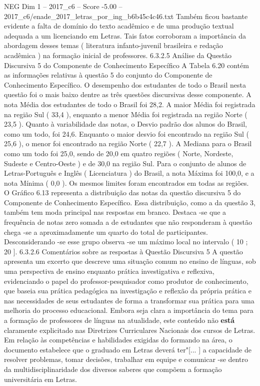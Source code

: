\begin{textsample}{NEG Dim 1 – 2017\_c6 – Score -5.00 – 2017\_c6/enade\_2017\_letras\_por\_ing\_b6b45c4c46.txt}
Também ficou bastante evidente a falta de domínio do texto acadêmico e de uma produção textual adequada a um licenciando em Letras.
Tais fatos corroboram a importância da abordagem desses temas ( literatura infanto-juvenil brasileira e redação acadêmica ) na formação inicial de professores. 6.3.2.5 Análise da Questão Discursiva 5 do Componente de Conhecimento Específico A Tabela 6.20 contém as informações relativas à questão 5 do conjunto do Componente de Conhecimento Específico.
O desempenho dos estudantes de todo o Brasil nesta questão foi o mais baixo dentre as três questões discursivas desse componente.
A nota Média dos estudantes de todo o Brasil foi 28,2.
A maior Média foi registrada na região Sul ( 33,4 ), enquanto a menor Média foi registrada na região Norte ( 23,5 ).
Quanto à variabilidade das notas, o Desvio padrão dos alunos do Brasil, como um todo, foi 24,6.
Enquanto o maior desvio foi encontrado na região Sul ( 25,6 ), o menor foi encontrado na região Norte ( 22,7 ).
A Mediana para o Brasil como um todo foi 25,0, sendo de 20,0 em quatro regiões ( Norte, Nordeste, Sudeste e Centro-Oeste ) e de 30,0 na região Sul.
Para o conjunto de alunos de Letras-Português e Inglês ( Licenciatura ) do Brasil, a nota Máxima foi 100,0, e a nota Mínima ( 0,0 ).
Os mesmos limites foram encontrados em todas as regiões.
O Gráfico 6.13 representa a distribuição das notas da questão discursiva 5 do Componente de Conhecimento Específico.
Essa distribuição, como a da questão 3, também tem moda principal nas respostas em branco.
Destaca -se que a frequência de notas zero somada a de estudantes que não responderam à questão chega -se a aproximadamente um quarto do total de participantes.
Desconsiderando -se esse grupo observa -se um máximo local no intervalo ( 10 ; 20 ]. 6.3.2.6 Comentários sobre as respostas à Questão Discursiva 5 A questão apresenta um excerto que descreve uma situação comum no ensino de línguas, sob uma perspectiva de ensino enquanto prática investigativa e reflexiva, evidenciando o papel do professor-pesquisador como produtor de conhecimento, que baseia sua prática pedagógica na investigação e reflexão da própria prática e nas necessidades de seus estudantes de forma a transformar sua prática para uma melhoria do processo educacional.
Embora seja clara a importância do tema para a formação de professores de línguas na atualidade, este conteúdo não \textbf{está} claramente explicitado nas Diretrizes Curriculares Nacionais dos cursos de Letras.
Em relação às competências e habilidades exigidas do formando na área, o documento estabelece que o graduado em Letras deverá ter"[... ] a capacidade de resolver problemas, tomar decisões, trabalhar em equipe e comunicar -se dentro da multidisciplinaridade dos diversos saberes que compõem a formação universitária em Letras.

\end{textsample}
